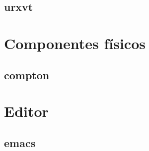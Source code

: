 \documentclass[a4paper, 11pt, titlepage]{book}
\begin{document}
        \subsection{urxvt}

    \section{Componentes físicos}

        \subsection{compton}

    \section{Editor}

        \subsection{emacs}
\end{document}

